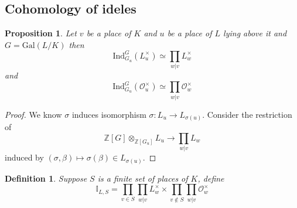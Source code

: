 \documentclass[twoside, 12pt]{iiser-thesis}
\newtheorem{prop}[thm]{ Proposition}
\newtheorem{defi}{ Definition}[section]
\newcommand{\Z}{\mathbb{Z}}
\newcommand{\I}{\mathbb{I}}
\newcommand{\Ol}{\mathcal{O}}
\newcommand{\gal}{\text{Gal}}
\newcommand{\x}{\times}
\begin{document}
\subsection{Cohomology of ideles}
\begin{prop}
Let $v$ be a place of $K$ and $u$ be a place of $L$ lying above it and $G=\gal(L/K)$ then \[\text{Ind}_{G_u}^G(L_u ^\x) \simeq \prod _{w|v} L^\x _w \] and \[ \text{Ind} _{G_u}^G(\Ol _u ^\x ) \simeq \prod _{w|v} \Ol _w ^\x \]
\end{prop}
\begin{proof}
We know $\sigma $ induces isomorphism $\sigma : L_u \rightarrow L_{\sigma (u)}$. Consider the restriction of \[ \Z [G] \otimes _{\Z[G_u]}L_u \rightarrow \prod _{w|v}L_w\]
induced by $(\sigma , \beta ) \mapsto \sigma (\beta )\in L_{\sigma (u)} .$
\end{proof}
\begin{defi}
Suppose $S$ is a finite set of places of $K$, define \[ \I _{L,S} = \prod _{v\in S} \prod _{w|v} L^\x _w \times \prod _{v\not \in S } \prod _{w|v} \Ol ^\x _w \]
\end{defi}
\end{document}
